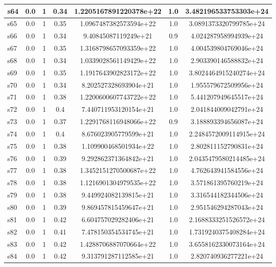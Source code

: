 \documentclass{article}
\begin{document}
\begin{tabular}{|l|c|c|c|c|c|c|}
\hline
s64 &0.0 & 1 & 0.34 & 1.2205167891220378e+22 & 1.0 & 3.482196533753303e+24\\
\hline
s65 &0.0 & 1 & 0.35 & 1.0967487382573594e+22 & 1.0 & 3.0891373320799785e+24\\
\hline
s66 &0.0 & 1 & 0.34 & 9.40845087119249e+21 & 0.9 & 4.024287958994939e+24\\
\hline
s67 &0.0 & 1 & 0.35 & 1.3168798657093359e+22 & 1.0 & 4.004539804769046e+24\\
\hline
s68 &0.0 & 1 & 0.34 & 1.0339028561149429e+22 & 1.0 & 2.903390146588832e+24\\
\hline
s69 &0.0 & 1 & 0.35 & 1.1917643902823172e+22 & 1.0 & 3.8024464915240274e+24\\
\hline
s70 &0.0 & 1 & 0.34 & 8.202527328693904e+21 & 1.0 & 1.955579672509956e+24\\
\hline
s71 &0.0 & 1 & 0.38 & 1.2200600607743722e+22 & 1.0 & 5.441207949645517e+24\\
\hline
s72 &0.0 & 1 & 0.4 & 7.440711953120154e+21 & 1.0 & 2.041844009042791e+24\\
\hline
s73 &0.0 & 1 & 0.37 & 1.2291768116948066e+22 & 0.9 & 3.188893394656087e+24\\
\hline
s74 &0.0 & 1 & 0.4 & 8.676023905779599e+21 & 1.0 & 2.2484572009114915e+24\\
\hline
s75 &0.0 & 1 & 0.38 & 1.109900468501934e+22 & 1.0 & 2.802811152790831e+24\\
\hline
s76 &0.0 & 1 & 0.39 & 9.292862371364842e+21 & 1.0 & 2.0435479580214485e+24\\
\hline
s77 &0.0 & 1 & 0.38 & 1.3452151270500687e+22 & 1.0 & 4.762643941584556e+24\\
\hline
s78 &0.0 & 1 & 0.38 & 1.1216901304979535e+22 & 1.0 & 3.571861395760219e+24\\
\hline
s79 &0.0 & 1 & 0.38 & 9.449924082139815e+21 & 1.0 & 3.316544182344506e+24\\
\hline
s80 &0.0 & 1 & 0.39 & 9.869457815459647e+21 & 1.0 & 2.951546294287043e+24\\
\hline
s81 &0.0 & 1 & 0.42 & 6.604757029282406e+21 & 1.0 & 2.1688333251526572e+24\\
\hline
s82 &0.0 & 1 & 0.41 & 7.478150354534745e+21 & 1.0 & 1.7319240375408284e+24\\
\hline
s83 &0.0 & 1 & 0.42 & 1.4288706887070664e+22 & 1.0 & 3.6558162330073164e+24\\
\hline
s84 &0.0 & 1 & 0.42 & 9.313791287112585e+21 & 1.0 & 2.820740936277221e+24\\
\hline

\end{tabular}
\end{document}
